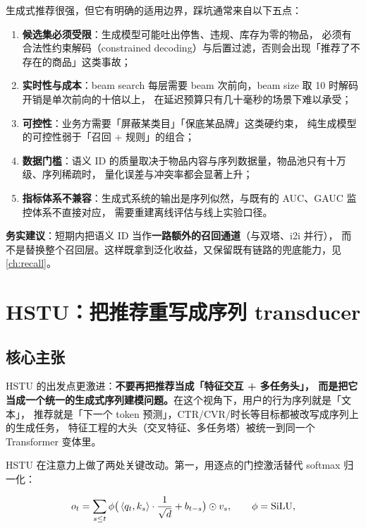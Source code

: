 \begin{pitfall}
生成式推荐很强，但它有明确的适用边界，踩坑通常来自以下五点：
\begin{enumerate}
  \item \textbf{候选集必须受限}：生成模型可能吐出停售、违规、库存为零的物品，
        必须有合法性约束解码（constrained decoding）与后置过滤，否则会出现「推荐了不存在的商品」这类事故；
  \item \textbf{实时性与成本}：beam search 每层需要 beam 次前向，beam size 取 10 时解码开销是单次前向的十倍以上，
        在延迟预算只有几十毫秒的场景下难以承受；
  \item \textbf{可控性}：业务方需要「屏蔽某类目」「保底某品牌」这类硬约束，
        纯生成模型的可控性弱于「召回 + 规则」的组合；
  \item \textbf{数据门槛}：语义 ID 的质量取决于物品内容与序列数据量，物品池只有十万级、序列稀疏时，
        量化误差与冲突率都会显著上升；
  \item \textbf{指标体系不兼容}：生成式系统的输出是序列似然，与既有的 AUC、GAUC 监控体系不直接对应，
        需要重建离线评估与线上实验口径。
\end{enumerate}
\textbf{务实建议}：短期内把语义 ID 当作\textbf{一路额外的召回通道}（与双塔、i2i 并行），
而不是替换整个召回层。这样既拿到泛化收益，又保留既有链路的兜底能力，见 \cref{ch:recall}。
\end{pitfall}

\section{HSTU：把推荐重写成序列 transducer}

\subsection{核心主张}

HSTU \cite{zhai2024hstu} 的出发点更激进：\textbf{不要再把推荐当成「特征交互 + 多任务头」，
而是把它当成一个统一的生成式序列建模问题。}在这个视角下，用户的行为序列就是「文本」，
推荐就是「下一个 token 预测」，CTR/CVR/时长等目标都被改写成序列上的生成任务，
特征工程的大头（交叉特征、多任务塔）被统一到同一个 Transformer 变体里。

HSTU 在注意力上做了两处关键改动。第一，用逐点的门控激活替代 softmax 归一化：

\begin{equation}
o_t = \sum_{s \le t} \phi\big( \left\langle  q_t ,  k_s  \right\rangle \cdot \frac{1}{\sqrt{d}} + b_{t-s} \big) \odot v_s ,
\qquad \phi = \text{SiLU} ,
\label{eq:hstu-attn}
\end{equation}

